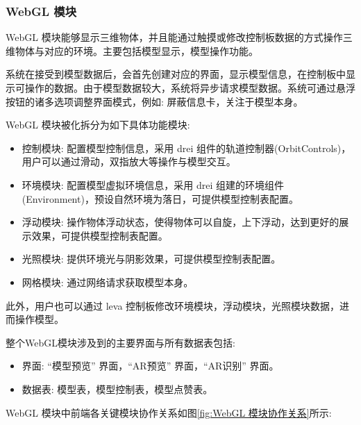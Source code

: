 \subsubsection{WebGL 模块}

WebGL 模块能够显示三维物体，并且能通过触摸或修改控制板数据的方式操作三维物体与对应的环境。主要包括模型显示，模型操作功能。

系统在接受到模型数据后，会首先创建对应的界面，显示模型信息，在控制板中显示可操作的数据。由于模型数据较大，系统将异步请求模型数据。系统可通过悬浮按钮的诸多选项调整界面模式，例如: 屏蔽信息卡，关注于模型本身。

WebGL 模块被化拆分为如下具体功能模块:
\begin{itemize}
  \item 控制模块: 配置模型控制信息，采用 drei 组件的轨道控制器(OrbitControls)，用户可以通过滑动，双指放大等操作与模型交互。
  \item 环境模块: 配置模型虚拟环境信息，采用 drei 组建的环境组件(Environment)，预设自然环境为落日，可提供模型控制表配置。
  \item 浮动模块: 操作物体浮动状态，使得物体可以自旋，上下浮动，达到更好的展示效果，可提供模型控制表配置。
  \item 光照模块: 提供环境光与阴影效果，可提供模型控制表配置。
  \item 网格模块: 通过网络请求获取模型本身。
\end{itemize}

此外，用户也可以通过 leva 控制板修改环境模块，浮动模块，光照模块数据，进而操作模型。

整个WebGL模块涉及到的主要界面与所有数据表包括:
\begin{itemize}
  \item 界面: ``模型预览'' 界面，``AR预览'' 界面，``AR识别'' 界面。
  \item 数据表: 模型表，模型控制表，模型点赞表。
\end{itemize}

WebGL 模块中前端各关键模块协作关系如图\ref{fig:WebGL 模块协作关系}所示:

